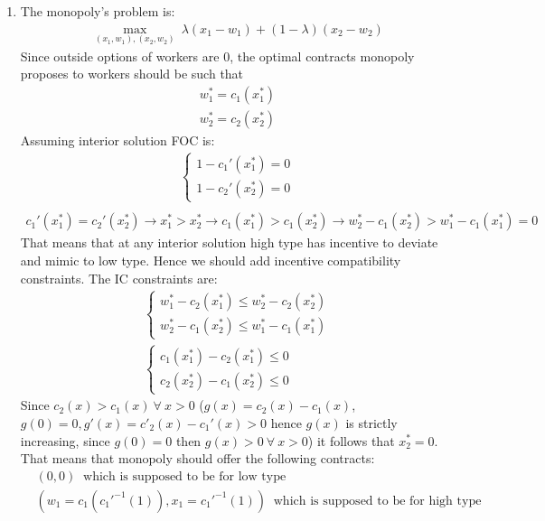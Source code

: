 \documentclass[a4paper]{article}
\begin{document}
\begin{enumerate}
	\item The monopoly's problem is:
	\begin{align*}
	\underset{(x_1, w_1), (x_2, w_2)}{\max}\ \lambda(x_1 - w_1) + (1 - \lambda)(x_2 - w_2)
	\end{align*}
	Since outside options of workers are 0, the optimal contracts monopoly proposes to workers should be such that
	\begin{align*}
	w_1^* = c_1(x_1^*)\\
	w_2^* = c_2(x_2^*)
	\end{align*}
	Assuming interior solution FOC is:
	\begin{align*}
	\begin{cases}
	1 - c_1'(x_1^*) = 0\\
	1 - c_2'(x_2^*) = 0
	\end{cases}\\
	\end{align*}
	\begin{align*}
	c_1'(x_1^*) = c_2'(x_2^*) \to x_1^* > x_2^* \to c_1(x_1^*) > c_1(x_2^*) \to w_2^* - c_1(x_2^*) > w_1^* - c_1(x_1^*) = 0
	\end{align*}
	That means that at any interior solution high type has incentive to deviate and mimic to low type. Hence we should add incentive compatibility constraints. The IC constraints are:
	\begin{align*}
	\begin{cases}
	w_1^* - c_2(x_1^*) \le w_2^* - c_2(x_2^*)\\
	w_2^* - c_1(x_2^*) \le w_1^* - c_1(x_1^*)
	\end{cases}\\
	\begin{cases}
	c_1(x_1^*) - c_2(x_1^*) \le 0\\
	c_2(x_2^*) - c_1(x_2^*) \le 0
	\end{cases}
	\end{align*}
	Since $c_2(x) > c_1(x)\ \forall\ x > 0$ ($g(x) = c_2(x) - c_1(x)$, $g(0) = 0, g'(x) = c'_2(x) - c_1'(x) > 0$ hence $g(x)$ is strictly increasing, since $g(0) = 0$ then $g(x)>0\ \forall\ x > 0$) it follows that $x_2^* = 0$. That means that monopoly should offer the following contracts:
	\begin{align*}
	&(0, 0)\ \text{ which is supposed to be for low type}\\
	&(w_1 = c_1(c_1'^{-1}(1)), x_1 = c_1'^{-1}(1))\ \text{ which is supposed to be for high type}
	\end{align*}

\end{enumerate}
\end{document}
